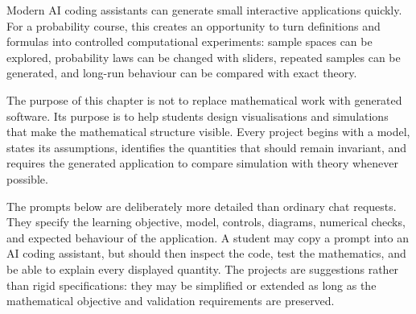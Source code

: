 Modern AI coding assistants can generate small interactive applications quickly. For a probability course, this creates an opportunity to turn definitions and formulas into controlled computational experiments: sample spaces can be explored, probability laws can be changed with sliders, repeated samples can be generated, and long-run behaviour can be compared with exact theory.

The purpose of this chapter is not to replace mathematical work with generated software. Its purpose is to help students design visualisations and simulations that make the mathematical structure visible. Every project begins with a model, states its assumptions, identifies the quantities that should remain invariant, and requires the generated application to compare simulation with theory whenever possible.

The prompts below are deliberately more detailed than ordinary chat requests. They specify the learning objective, model, controls, diagrams, numerical checks, and expected behaviour of the application. A student may copy a prompt into an AI coding assistant, but should then inspect the code, test the mathematics, and be able to explain every displayed quantity. The projects are suggestions rather than rigid specifications: they may be simplified or extended as long as the mathematical objective and validation requirements are preserved.













